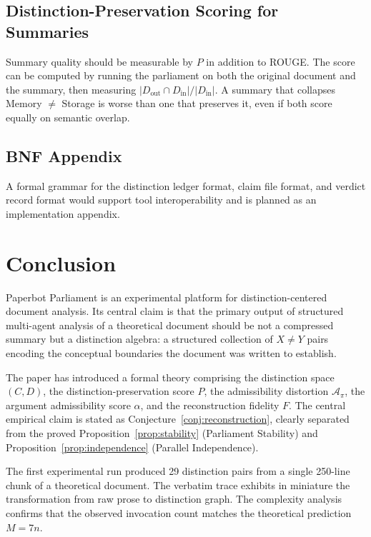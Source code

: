 \documentclass[12pt, a4paper]{article}
\theoremstyle{principle}
\theoremstyle{definition}
\begin{document}
\subsection{Distinction-Preservation Scoring for Summaries}

Summary quality should be measurable by $P$ in addition to ROUGE. The score can be
computed by running the parliament on both the original document and the summary,
then measuring $|D_\mathrm{out} \cap D_\mathrm{in}| / |D_\mathrm{in}|$. A summary
that collapses Memory $\neq$ Storage is worse than one that preserves it, even if
both score equally on semantic overlap.

\subsection{BNF Appendix}

A formal grammar for the distinction ledger format, claim file format, and verdict
record format would support tool interoperability and is planned as an implementation
appendix.

\section{Conclusion}

Paperbot Parliament is an experimental platform for distinction-centered document
analysis. Its central claim is that the primary output of structured multi-agent
analysis of a theoretical document should be not a compressed summary but a
distinction algebra: a structured collection of $X \neq Y$ pairs encoding the
conceptual boundaries the document was written to establish.

The paper has introduced a formal theory comprising the distinction space $(C, D)$,
the distinction-preservation score $P$, the admissibility distortion
$\mathcal{A}_\pi$, the argument admissibility score $\alpha$, and the
reconstruction fidelity $F$. The central empirical claim is stated as
Conjecture~\ref{conj:reconstruction}, clearly separated from the proved
Proposition~\ref{prop:stability} (Parliament Stability) and
Proposition~\ref{prop:independence} (Parallel Independence).

The first experimental run produced 29 distinction pairs from a single 250-line
chunk of a theoretical document. The verbatim trace exhibits in miniature the
transformation from raw prose to distinction graph. The complexity analysis confirms
that the observed invocation count matches the theoretical prediction $M = 7n$.
\end{document}
